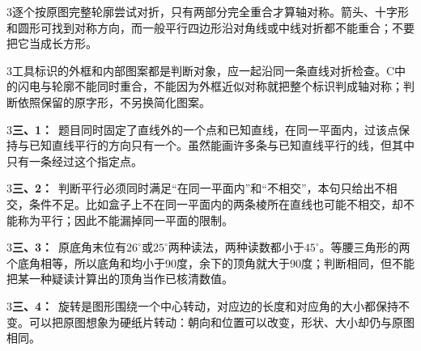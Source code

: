 \documentclass[multi=snippet,border={5bp 20bp 5bp 5bp}]{standalone}
\newenvironment{snippet}[3]{\begin{minipage}{#1bp}\color{answerred}\fontsize{#2}{#3}\selectfont\raggedright}{\end{minipage}}
\begin{document}
\begin{snippet}{505}{11.5}{14}\begin{multicols}{3}\raggedcolumns 逐个按原图完整轮廓尝试对折，只有两部分完全重合才算轴对称。箭头、十字形和圆形可找到对称方向，而一般平行四边形沿对角线或中线对折都不能重合；不要把它当成长方形。\end{multicols}\end{snippet}
\begin{snippet}{505}{11.5}{14}\begin{multicols}{3}\raggedcolumns 工具标识的外框和内部图案都是判断对象，应一起沿同一条直线对折检查。C中的闪电与轮廓不能同时重合，不能因为外框近似对称就把整个标识判成轴对称；判断依照保留的原字形，不另换简化图案。\end{multicols}\end{snippet}
\begin{snippet}{505}{11.5}{14}\begin{multicols}{3}\raggedcolumns \textbf{三、1：}\ 题目同时固定了直线外的一个点和已知直线，在同一平面内，过该点保持与已知直线平行的方向只有一个。虽然能画许多条与已知直线平行的线，但其中只有一条经过这个指定点。\end{multicols}\end{snippet}
\begin{snippet}{505}{11.5}{14}\begin{multicols}{3}\raggedcolumns \textbf{三、2：}\ 判断平行必须同时满足“在同一平面内”和“不相交”，本句只给出不相交，条件不足。比如盒子上不在同一平面内的两条棱所在直线也可能不相交，却不能称为平行；因此不能漏掉同一平面的限制。\end{multicols}\end{snippet}
\begin{snippet}{505}{11.5}{14}\begin{multicols}{3}\raggedcolumns \textbf{三、3：}\ 原底角末位有\(26^\circ\)\allowbreak 或\(25^\circ\)\allowbreak 两种读法，两种读数都小于\(45^\circ\)\allowbreak 。等腰三角形的两个底角相等，所以底角和均小于90度，余下的顶角就大于90度；判断相同，但不能把某一种疑读计算出的顶角当作已核清数值。\end{multicols}\end{snippet}
\begin{snippet}{505}{11.5}{14}\begin{multicols}{3}\raggedcolumns \textbf{三、4：}\ 旋转是图形围绕一个中心转动，对应边的长度和对应角的大小都保持不变。可以把原图想象为硬纸片转动：朝向和位置可以改变，形状、大小却仍与原图相同。\end{multicols}\end{snippet}
\end{document}
